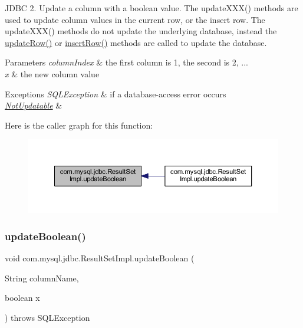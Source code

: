 J\+D\+BC 2. Update a column with a boolean value. The update\+X\+X\+X() methods are used to update column values in the current row, or the insert row. The update\+X\+X\+X() methods do not update the underlying database, instead the \mbox{\hyperlink{classcom_1_1mysql_1_1jdbc_1_1_result_set_impl_a2842d32292d023aaeeafedeed3322981}{update\+Row()}} or \mbox{\hyperlink{classcom_1_1mysql_1_1jdbc_1_1_result_set_impl_a78e304e3279cbcf60392f18c1385e3bf}{insert\+Row()}} methods are called to update the database.


\begin{DoxyParams}{Parameters}
{\em column\+Index} & the first column is 1, the second is 2, ... \\
\hline
{\em x} & the new column value\\
\hline
\end{DoxyParams}

\begin{DoxyExceptions}{Exceptions}
{\em S\+Q\+L\+Exception} & if a database-\/access error occurs \\
\hline
{\em \mbox{\hyperlink{classcom_1_1mysql_1_1jdbc_1_1_not_updatable}{Not\+Updatable}}} & \\
\hline
\end{DoxyExceptions}
Here is the caller graph for this function\+:
\nopagebreak
\begin{figure}[H]
\begin{center}
\leavevmode
\includegraphics[width=350pt]{classcom_1_1mysql_1_1jdbc_1_1_result_set_impl_a60710525a754d8fe76c4ff0f963ff1f7_icgraph}
\end{center}
\end{figure}
\mbox{\label{classcom_1_1mysql_1_1jdbc_1_1_result_set_impl_a94e7117ecf4f1109efc090bea53a95eb}} 
\subsubsection{\texorpdfstring{update\+Boolean()}{updateBoolean()}\hspace{0.1cm}{\footnotesize\ttfamily [2/2]}}
{\footnotesize\ttfamily void com.\+mysql.\+jdbc.\+Result\+Set\+Impl.\+update\+Boolean (\begin{DoxyParamCaption}\item[{String}]{column\+Name,  }\item[{boolean}]{x }\end{DoxyParamCaption}) throws S\+Q\+L\+Exception}

